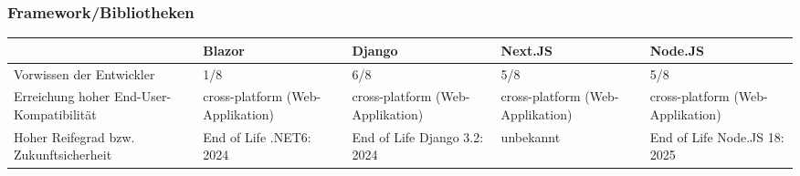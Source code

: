 

\subsubsection*{Framework/Bibliotheken}

\begin{tabular} {|m{3cm}|m{3cm}|m{3cm}|m{3cm}|m{3cm}|}
\hline
 & Blazor & Django & Next.JS & Node.JS \\
\hline
Vorwissen der Entwickler & 1/8 & 6/8 & 5/8 & 5/8 \\
\hline
Erreichung hoher End-User-Kompatibilität & cross-platform (Web-Applikation) & cross-platform (Web-Applikation) & cross-platform (Web-Applikation) & cross-platform (Web-Applikation) \\
\hline
Hoher Reifegrad bzw. Zukunftsicherheit & End of Life .NET6: 2024 & End of Life Django 3.2: 2024 & unbekannt & End of Life Node.JS 18: 2025 \\
\hline
\end{tabular}




